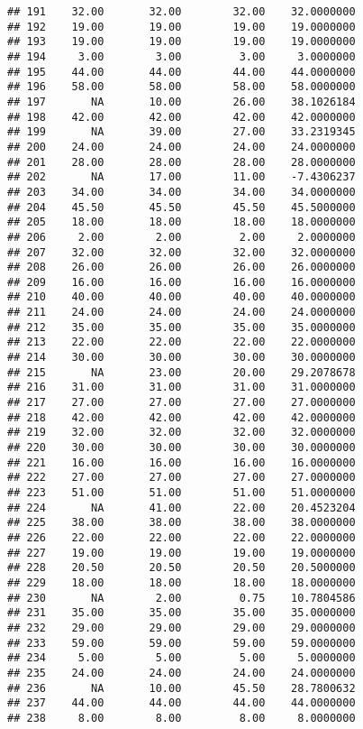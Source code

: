 \documentclass[
]{article}
\begin{document}
\begin{verbatim}
## 191    32.00       32.00        32.00    32.0000000
## 192    19.00       19.00        19.00    19.0000000
## 193    19.00       19.00        19.00    19.0000000
## 194     3.00        3.00         3.00     3.0000000
## 195    44.00       44.00        44.00    44.0000000
## 196    58.00       58.00        58.00    58.0000000
## 197       NA       10.00        26.00    38.1026184
## 198    42.00       42.00        42.00    42.0000000
## 199       NA       39.00        27.00    33.2319345
## 200    24.00       24.00        24.00    24.0000000
## 201    28.00       28.00        28.00    28.0000000
## 202       NA       17.00        11.00    -7.4306237
## 203    34.00       34.00        34.00    34.0000000
## 204    45.50       45.50        45.50    45.5000000
## 205    18.00       18.00        18.00    18.0000000
## 206     2.00        2.00         2.00     2.0000000
## 207    32.00       32.00        32.00    32.0000000
## 208    26.00       26.00        26.00    26.0000000
## 209    16.00       16.00        16.00    16.0000000
## 210    40.00       40.00        40.00    40.0000000
## 211    24.00       24.00        24.00    24.0000000
## 212    35.00       35.00        35.00    35.0000000
## 213    22.00       22.00        22.00    22.0000000
## 214    30.00       30.00        30.00    30.0000000
## 215       NA       23.00        20.00    29.2078678
## 216    31.00       31.00        31.00    31.0000000
## 217    27.00       27.00        27.00    27.0000000
## 218    42.00       42.00        42.00    42.0000000
## 219    32.00       32.00        32.00    32.0000000
## 220    30.00       30.00        30.00    30.0000000
## 221    16.00       16.00        16.00    16.0000000
## 222    27.00       27.00        27.00    27.0000000
## 223    51.00       51.00        51.00    51.0000000
## 224       NA       41.00        22.00    20.4523204
## 225    38.00       38.00        38.00    38.0000000
## 226    22.00       22.00        22.00    22.0000000
## 227    19.00       19.00        19.00    19.0000000
## 228    20.50       20.50        20.50    20.5000000
## 229    18.00       18.00        18.00    18.0000000
## 230       NA        2.00         0.75    10.7804586
## 231    35.00       35.00        35.00    35.0000000
## 232    29.00       29.00        29.00    29.0000000
## 233    59.00       59.00        59.00    59.0000000
## 234     5.00        5.00         5.00     5.0000000
## 235    24.00       24.00        24.00    24.0000000
## 236       NA       10.00        45.50    28.7800632
## 237    44.00       44.00        44.00    44.0000000
## 238     8.00        8.00         8.00     8.0000000

\end{verbatim}
\end{document}
